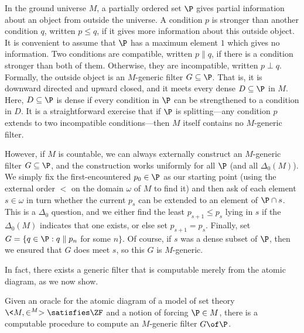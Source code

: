 \documentclass{amsart}
\begin{document}
In the ground universe $M$, a partially ordered set $\P$ gives partial information about an object from outside the universe.  A condition $p$ is stronger than another condition $q$, written $p \le q$, if it gives more information about this outside object. It is convenient to assume that $\P$ has a maximum element $1$ which gives no information.
Two conditions are compatible, written $p \parallel q$, if there is a condition stronger than both of them. Otherwise, they are incompatible, written $p \perp q$. Formally, the outside object is an $M$-generic filter $G \subseteq \P$. That is, it  is downward directed and upward closed, and it meets every dense $D \subseteq \P$ in $M$. Here, $D \subseteq \P$ is dense if every condition in $\P$ can be strengthened to a condition in $D$. It is a straightforward exercise that if $\P$ is
splitting---any condition $p$ extends to two incompatible conditions---then $M$ itself contains no $M$-generic filter.

However, if $M$ is countable, we can always externally construct an $M$-generic filter $G \subseteq \P$,
and the construction works uniformly for all $\P$ (and all $\Delta_0(M)$).  We simply fix the first-encountered $p_0\in\P$
as our starting point (using the external order $<$ on the domain $\omega$ of $M$ to find it)
and then ask of each element $s\in\omega$ in turn whether the current $p_s$ can be extended to an
element of $\P\cap s$.  This is a $\Delta_0$ question, and we either find the least $p_{s+1}\leq p_s$
lying in $s$ if the $\Delta_0(M)$ indicates that one exists, or else set $p_{s+1}=p_s$.
Finally, set $G = \{ q \in \P : q \parallel p_n$ for some $n\}$.  Of course, if $s$ was a dense
subset of $\P$, then we ensured that $G$ does meet $s$, so this $G$ is $M$-generic.


In fact, there exists a generic filter that is computable merely from the atomic diagram, as we now  show.

\begin{theorem}\label{Theorem.Computing-generic-filter}
Given an oracle for the atomic diagram of a model of set theory $\<M,\in^M>\satisfies\ZF$ and a notion of forcing $\P\in M$, there is a computable procedure to compute an $M$-generic filter $G\of\P$.
\end{theorem}
\end{document}
